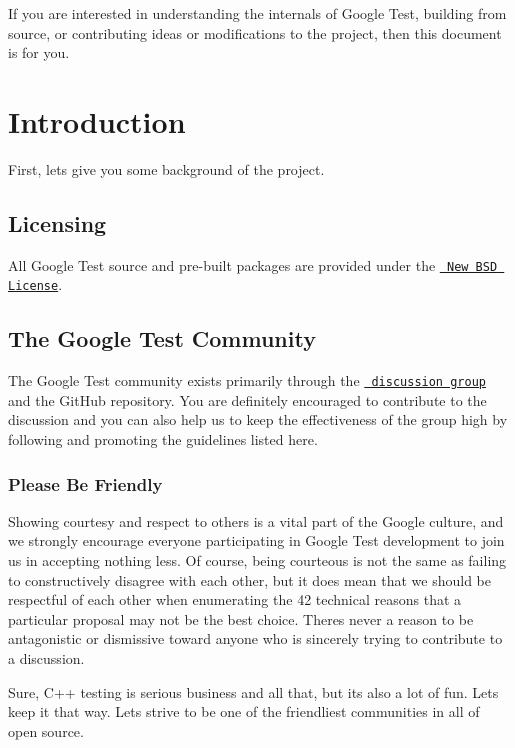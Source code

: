 If you are interested in understanding the internals of Google Test, building from source, or contributing ideas or modifications to the project, then this document is for you.

\section*{Introduction}

First, let\textquotesingle{}s give you some background of the project.

\subsection*{Licensing}

All Google Test source and pre-\/built packages are provided under the \href{http://www.opensource.org/licenses/bsd-license.php}\texttt{ New B\+SD License}.

\subsection*{The Google Test Community}

The Google Test community exists primarily through the \href{http://groups.google.com/group/googletestframework}\texttt{ discussion group} and the Git\+Hub repository. You are definitely encouraged to contribute to the discussion and you can also help us to keep the effectiveness of the group high by following and promoting the guidelines listed here.

\subsubsection*{Please Be Friendly}

Showing courtesy and respect to others is a vital part of the Google culture, and we strongly encourage everyone participating in Google Test development to join us in accepting nothing less. Of course, being courteous is not the same as failing to constructively disagree with each other, but it does mean that we should be respectful of each other when enumerating the 42 technical reasons that a particular proposal may not be the best choice. There\textquotesingle{}s never a reason to be antagonistic or dismissive toward anyone who is sincerely trying to contribute to a discussion.

Sure, C++ testing is serious business and all that, but it\textquotesingle{}s also a lot of fun. Let\textquotesingle{}s keep it that way. Let\textquotesingle{}s strive to be one of the friendliest communities in all of open source.

